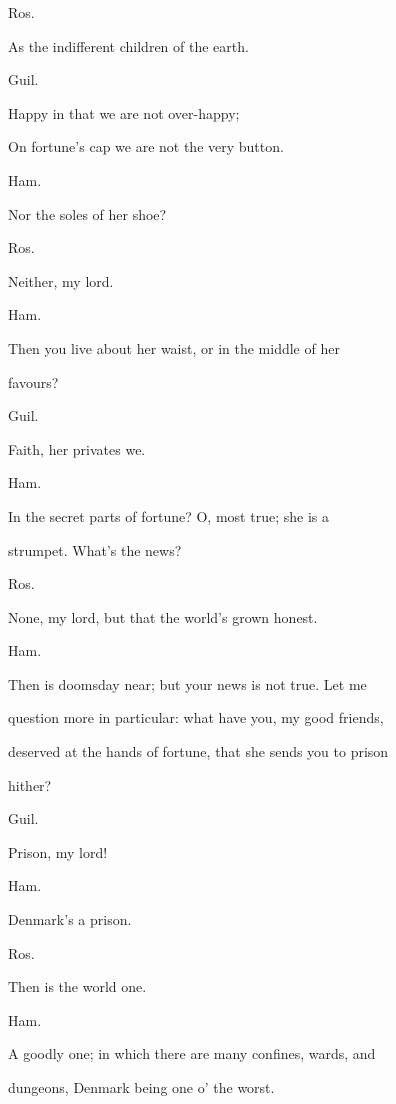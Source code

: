 \documentclass[12pt]{book}
\begin{document}
Ros.

As the indifferent children of the earth.



Guil.

Happy in that we are not over-happy;

On fortune's cap we are not the very button.



Ham.

Nor the soles of her shoe?



Ros.

Neither, my lord.



Ham.

Then you live about her waist, or in the middle of her

favours?



Guil.

Faith, her privates we.



Ham.

In the secret parts of fortune? O, most true; she is a

strumpet. What's the news?



Ros.

None, my lord, but that the world's grown honest.



Ham.

Then is doomsday near; but your news is not true. Let me

question more in particular: what have you, my good friends,

deserved at the hands of fortune, that she sends you to prison

hither?



Guil.

Prison, my lord!



Ham.

Denmark's a prison.



Ros.

Then is the world one.



Ham.

A goodly one; in which there are many confines, wards, and

dungeons, Denmark being one o' the worst.
\end{document}
